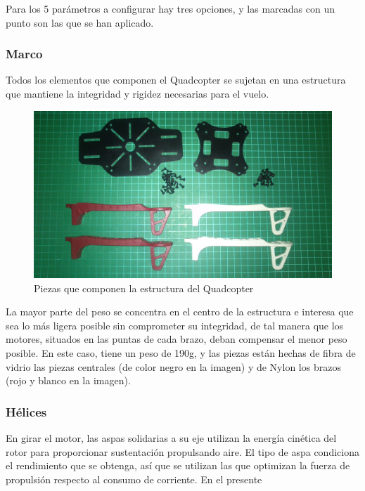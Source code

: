 \documentclass[twoside]{article}
\begin{document}
Para los 5 parámetros a configurar hay tres opciones, y las marcadas con un punto son las que se han aplicado.

\subsubsection*{Marco}

Todos los elementos que componen el Quadcopter se sujetan en una estructura que mantiene la integridad y rigidez necesarias para el vuelo.

\begin{figure}[h!]
\begin{center}
\includegraphics[scale=0.1]{images/frame.jpg}
\caption{Piezas que componen la estructura del Quadcopter}
\end{center}
\end{figure}

La mayor parte del peso se concentra en el centro de la estructura e interesa que sea lo más ligera posible sin comprometer su integridad, de tal manera que los motores, situados en las puntas de cada brazo, deban compensar el menor peso posible. En este caso, tiene un peso de 190g, y las piezas están hechas de fibra de vidrio las piezas centrales (de color negro en la imagen) y de Nylon los brazos (rojo y blanco en la imagen).


\subsubsection*{Hélices}

En girar el motor, las aspas solidarias a su eje utilizan la energía cinética del rotor para proporcionar sustentación propulsando aire. El tipo de aspa condiciona el rendimiento que se obtenga, así que se utilizan las que optimizan la fuerza de propulsión respecto al consumo de corriente. En el presente
\end{document}
